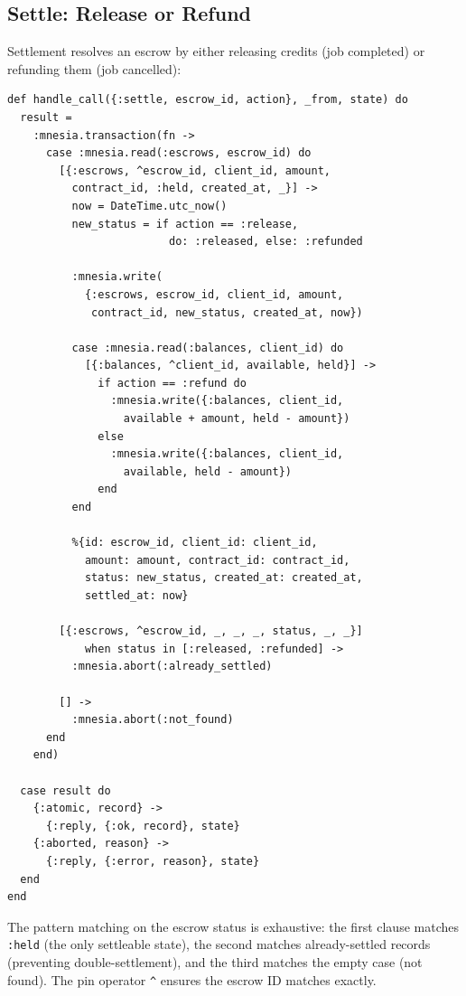 \documentclass[12pt,a4paper]{article}
\theoremstyle{plain}
\theoremstyle{definition}
\begin{document}
\subsection{Settle: Release or Refund}

Settlement resolves an escrow by either releasing credits (job completed) or refunding them (job cancelled):

\begin{lstlisting}[caption={Escrow settlement via pattern matching},label={lst:escrow-settle}]
def handle_call({:settle, escrow_id, action}, _from, state) do
  result =
    :mnesia.transaction(fn ->
      case :mnesia.read(:escrows, escrow_id) do
        [{:escrows, ^escrow_id, client_id, amount,
          contract_id, :held, created_at, _}] ->
          now = DateTime.utc_now()
          new_status = if action == :release,
                         do: :released, else: :refunded

          :mnesia.write(
            {:escrows, escrow_id, client_id, amount,
             contract_id, new_status, created_at, now})

          case :mnesia.read(:balances, client_id) do
            [{:balances, ^client_id, available, held}] ->
              if action == :refund do
                :mnesia.write({:balances, client_id,
                  available + amount, held - amount})
              else
                :mnesia.write({:balances, client_id,
                  available, held - amount})
              end
          end

          %{id: escrow_id, client_id: client_id,
            amount: amount, contract_id: contract_id,
            status: new_status, created_at: created_at,
            settled_at: now}

        [{:escrows, ^escrow_id, _, _, _, status, _, _}]
            when status in [:released, :refunded] ->
          :mnesia.abort(:already_settled)

        [] ->
          :mnesia.abort(:not_found)
      end
    end)

  case result do
    {:atomic, record} ->
      {:reply, {:ok, record}, state}
    {:aborted, reason} ->
      {:reply, {:error, reason}, state}
  end
end
\end{lstlisting}

The pattern matching on the escrow status is exhaustive: the first clause matches \texttt{:held} (the only settleable state), the second matches already-settled records (preventing double-settlement), and the third matches the empty case (not found). The pin operator \texttt{\^{}} ensures the escrow ID matches exactly.
\end{document}
